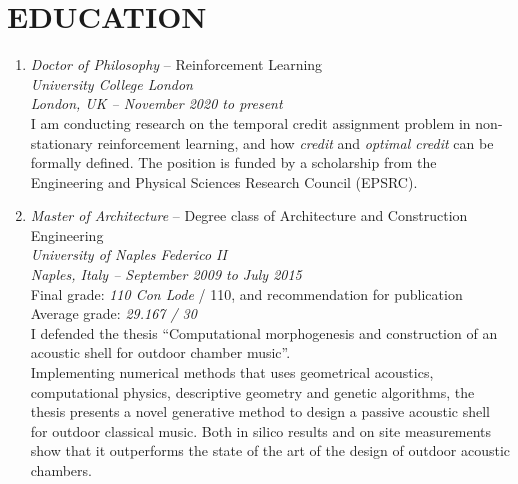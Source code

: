 \section*{EDUCATION}
    \begin{enumerate}[leftmargin=0.45cm, itemsep=1em, topsep=0.5em, parsep=0.2em]
        \item
        \emph{Doctor of Philosophy} -- Reinforcement Learning \\
        \emph{University College London} \\
        \textit{London, UK -- November 2020 to \emph{present}}  \vspace{0.2em} \\
        {I am conducting research on the temporal credit assignment problem in non-stationary reinforcement learning, and how \textit{credit} and \textit{optimal credit} can be formally defined. The position is funded by a scholarship from the Engineering and Physical Sciences Research Council (EPSRC).}
        \item
        \emph{Master of Architecture} -- Degree class of Architecture and Construction Engineering \\
        \emph{University of Naples Federico II} \\
        \textit{Naples, Italy -- September 2009 to July 2015} \\
        Final grade: \emph{110 Con Lode} / 110, and recommendation for publication \\
        Average grade: \emph{29.167 / 30}  \vspace{0.2em} \\
        {I defended the thesis “Computational morphogenesis and construction of an acoustic shell for outdoor chamber music”. \\Implementing numerical methods that uses geometrical acoustics, computational physics, descriptive geometry and genetic algorithms, the thesis presents a novel generative method to design a passive acoustic shell for outdoor classical music. Both in silico results and on site measurements show that it outperforms the state of the art of the design of outdoor acoustic chambers.}
    \end{enumerate}